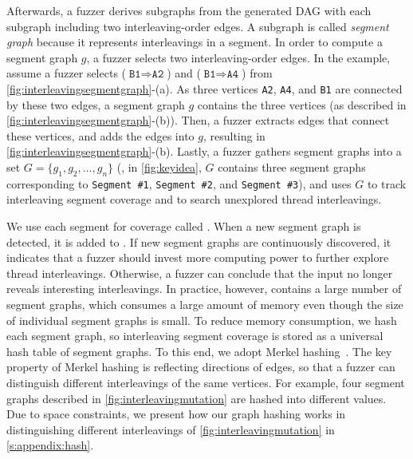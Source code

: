 Afterwards, a fuzzer derives subgraphs from the generated DAG with 
each subgraph including two interleaving-order edges. A subgraph 
is called \textit{segment graph} because it represents interleavings 
in a segment.
%
In order to compute a segment graph $g$, a fuzzer selects two
interleaving-order edges.
%
In the example, assume a fuzzer selects
($\texttt{B1} \Rightarrow \texttt{A2}$) and
($\texttt{B1} \Rightarrow \texttt{A4}$) from
\autoref{fig:interleavingsegmentgraph}-(a).
%
As three vertices \texttt{A2}, \texttt{A4}, and \texttt{B1} are
connected by these two edges, a segment graph $g$ contains the three
vertices (as described in \autoref{fig:interleavingsegmentgraph}-(b)).
%
Then, a fuzzer extracts edges that connect these vertices, and adds
the edges into $g$, resulting in
\autoref{fig:interleavingsegmentgraph}-(b).
%
Lastly, a fuzzer gathers segment graphs into a set
$G = \{g_1, g_2, ..., g_n\}$ (\eg, in \autoref{fig:keyidea}, $G$
contains three segment graphs corresponding to \texttt{Segment \#1},
\texttt{Segment \#2}, and \texttt{Segment \#3}), and uses $G$ to track
interleaving segment coverage and to search unexplored thread
interleavings.



We use each segment for coverage called \textit{\intcov}. When a new segment graph is detected, it is added to \intcov.
If new segment graphs are continuously discovered, it indicates that 
a fuzzer should
invest more computing power to further explore thread interleavings.
Otherwise, a fuzzer can conclude that the input no longer
reveals interesting interleavings.
In practice, however, \intcov contains a large number of segment
graphs, which consumes a large amount of memory even though the size
of individual segment graphs is small.
%
To reduce memory consumption, we hash each segment graph, 
so interleaving segment coverage is stored as a universal hash table of segment graphs.
%
To this end, we adopt Merkel hashing~\cite{treehashing, treehashing2}.
%
The key property of Merkel hashing is reflecting directions of edges,
so that a fuzzer can distinguish different interleavings of the same
vertices. For example, four segment graphs described in
\autoref{fig:interleavingmutation} are hashed into different values.
%
Due to space constraints, we present how our graph hashing works in
distinguishing different interleavings of
\autoref{fig:interleavingmutation} in \autoref{s:appendix:hash}.








